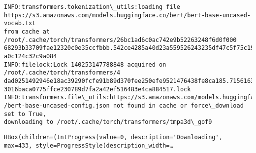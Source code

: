 \documentclass[10pt]{article}
\begin{document}
    \begin{Verbatim}[commandchars=\\\{\}]
INFO:transformers.tokenization\_utils:loading file
https://s3.amazonaws.com/models.huggingface.co/bert/bert-base-uncased-vocab.txt
from cache at /root/.cache/torch/transformers/26bc1ad6c0ac742e9b52263248f6d0f000
68293b33709fae12320c0e35ccfbbb.542ce4285a40d23a559526243235df47c5f75c197f04f37d1
a0c124c32c9a084
INFO:filelock:Lock 140253147788848 acquired on /root/.cache/torch/transformers/4
dad0251492946e18ac39290fcfe91b89d370fee250efe9521476438fe8ca185.7156163d5fdc189c
3016baca0775ffce230789d7fa2a42ef516483e4ca884517.lock
INFO:transformers.file\_utils:https://s3.amazonaws.com/models.huggingface.co/bert
/bert-base-uncased-config.json not found in cache or force\_download set to True,
downloading to /root/.cache/torch/transformers/tmpa3d\_gof9
    \end{Verbatim}

    
    \begin{verbatim}
HBox(children=(IntProgress(value=0, description='Downloading', max=433, style=ProgressStyle(description_width=…
    \end{verbatim}
\end{document}
